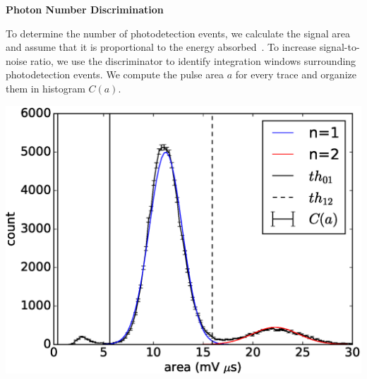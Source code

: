 \begin{center}
  \begin{center} {\bf \Large \textsf {Photon Number Discrimination}}\end{center}
\end{center}

To determine the number of photodetection events, we calculate the signal area and assume that it is proportional to the energy absorbed~\cite{Cabrera2000509}.
%
To increase signal-to-noise ratio, we use the discriminator to identify integration windows surrounding photodetection events.
%
We compute the pulse area $a$ for every trace
and organize them in histogram $C(a)$.

\begin{figurehere}
  \begin{center}
	\includegraphics[width=0.9\linewidth]{figures/area_histogram_cw/area_histo_with_fit.eps}
  \end{center}
\end{figurehere}
